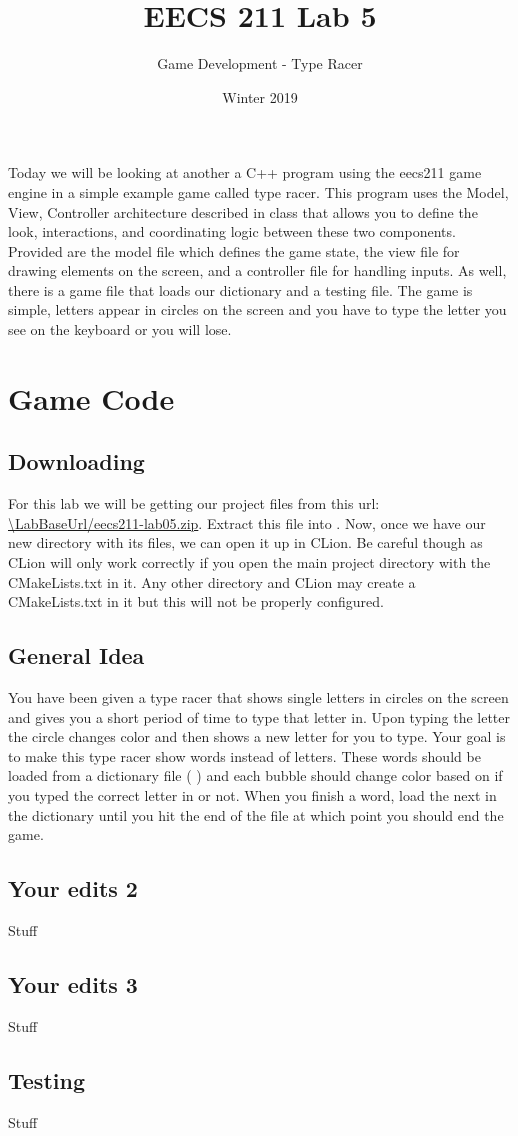 \documentclass{tufte-handout}
\title{EECS 211 Lab 5}
\author{Game Development - Type Racer}
\date{Winter 2019}
\def\ThisLabBase{eecs211-lab05}
\def\ThisLabUrl{\LabBaseUrl/\ThisLabBase.zip}
\begin{document}
\maketitle

Today we will be looking at another a C++ program using the eecs211 game engine
in a simple example game called type racer. This program uses the Model, View,
Controller architecture described in class that allows you to define the look,
interactions, and coordinating logic between these two components. Provided are
the model file which defines the game state, the view file for drawing elements
on the screen, and a controller file for handling inputs. As well, there is a
game file that loads our dictionary and a testing file. The game is simple,
letters appear in circles on the screen and you have to type the letter you see
on the keyboard or you will lose.

\section{Game Code}

\subsection{Downloading}

For this lab we will be getting our project files from this url:
\url{\ThisLabUrl}. Extract this file into \filename{\ThisLabBase}.
Now, once we have our new directory \filename{\ThisLabBase} with its
files, we can open it up in CLion. Be careful though as CLion will
only work correctly if you open the main project directory with the
CMakeLists.txt in it. Any other directory and CLion may create a
CMakeLists.txt in it but this will not be properly configured.

\subsection{General Idea}

You have been given a type racer that shows single letters in circles on
the screen and gives you a short period of time to type that letter in. Upon
typing the letter the circle changes color and then shows a new letter for you
to type. Your goal is to make this type racer show words instead of letters.
These words should be loaded from a dictionary file (
) and each bubble should change color based
on if you typed the correct letter in or not. When you finish a word, load the
next in the dictionary until you hit the end of the file at which point you should
end the game.

\subsection{Your edits 2}

Stuff

\subsection{Your edits 3}

Stuff

\subsection{Testing}

Stuff
\end{document}

